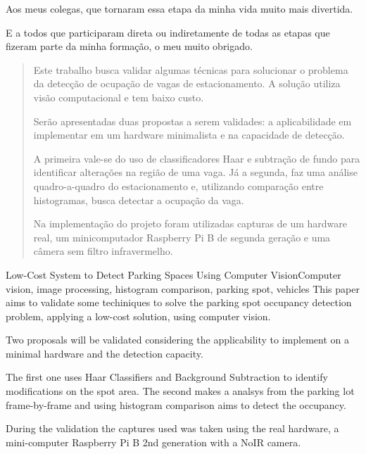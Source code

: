 \documentclass[ecp,tc]{iiufrgs}
\begin{document}
Aos meus colegas, que tornaram essa etapa da minha vida muito mais divertida.

E a todos que participaram direta ou indiretamente de todas as etapas que fizeram parte da minha formação, o meu muito obrigado.


\begin{abstract}
Este trabalho busca validar algumas técnicas para solucionar o problema da detecção de ocupação de vagas de estacionamento. A solução utiliza visão computacional e tem baixo custo.

Serão apresentadas duas propostas a serem validades: a aplicabilidade em implementar em um hardware minimalista e na capacidade de detecção. 

A primeira vale-se do uso de classificadores Haar e subtração de fundo para identificar alterações na região de uma vaga. Já a segunda, faz uma análise quadro-a-quadro do estacionamento e, utilizando comparação entre histogramas, busca detectar a ocupação da vaga. 

Na implementação do projeto foram utilizadas capturas de um hardware real, um minicomputador Raspberry Pi B de segunda geração e uma câmera sem filtro infravermelho.
\end{abstract}

\begin{englishabstract}{Low-Cost System to Detect Parking Spaces Using Computer Vision}{Computer vision, image processing, histogram comparison, parking spot, vehicles}
This paper aims to validate some techiniques to solve the parking spot occupancy detection problem, applying a low-cost solution, using computer vision.

Two proposals will be validated considering the applicability to implement on a minimal hardware and the detection capacity.

The first one uses Haar Classifiers and Background Subtraction to identify modifications on the spot area. The second makes a analsys from the parking lot frame-by-frame and using histogram comparison aims to detect the occupancy. 

During the validation the captures used was taken using the real hardware, a mini-computer Raspberry Pi B 2nd generation with a NoIR camera.
\end{englishabstract}
\end{document}
